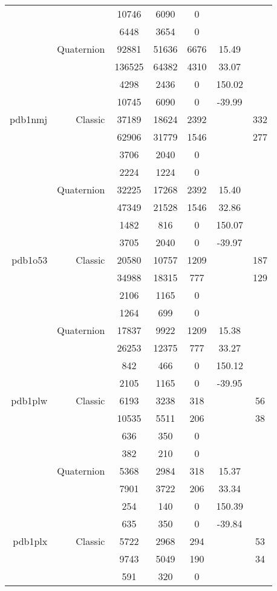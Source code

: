 \begin{xltabular}{\textwidth}{r|rcccSc}
& & 10746 & 6090 & 0 & & \\
& & 6448 & 3654 & 0 & & \\
& Quaternion & 92881 & 51636 & 6676 & 15.49 & \\
& & 136525 & 64382 & 4310 & 33.07 & \\
& & 4298 & 2436 & 0 & 150.02 & \\
& & 10745 & 6090 & 0 & -39.99 & \\ \addlinespace
pdb1nmj & Classic & 37189 & 18624 & 2392 & & 332 \\
& & 62906 & 31779 & 1546 & & 277 \\
& & 3706 & 2040 & 0 & & \\
& & 2224 & 1224 & 0 & & \\
& Quaternion & 32225 & 17268 & 2392 & 15.40 & \\
& & 47349 & 21528 & 1546 & 32.86 & \\
& & 1482 & 816 & 0 & 150.07 & \\
& & 3705 & 2040 & 0 & -39.97 & \\ \addlinespace
pdb1o53 & Classic & 20580 & 10757 & 1209 & & 187 \\
& & 34988 & 18315 & 777 & & 129 \\
& & 2106 & 1165 & 0 & & \\
& & 1264 & 699 & 0 & & \\
& Quaternion & 17837 & 9922 & 1209 & 15.38 & \\
& & 26253 & 12375 & 777 & 33.27 & \\
& & 842 & 466 & 0 & 150.12 & \\
& & 2105 & 1165 & 0 & -39.95 & \\ \addlinespace
pdb1plw & Classic & 6193 & 3238 & 318 & & 56 \\
& & 10535 & 5511 & 206 & & 38 \\
& & 636 & 350 & 0 & & \\
& & 382 & 210 & 0 & & \\
& Quaternion & 5368 & 2984 & 318 & 15.37 & \\
& & 7901 & 3722 & 206 & 33.34 & \\
& & 254 & 140 & 0 & 150.39 & \\
& & 635 & 350 & 0 & -39.84 & \\ \addlinespace
pdb1plx & Classic & 5722 & 2968 & 294 & & 53 \\
& & 9743 & 5049 & 190 & & 34 \\
& & 591 & 320 & 0 & & \\

\end{xltabular}
